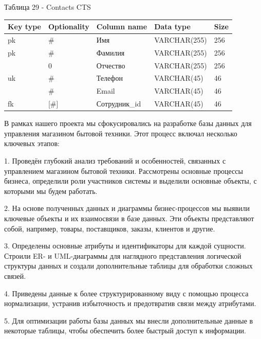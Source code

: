 \documentclass[14pt]{extreport}
\begin{document}
\noindent
Таблица 29 - Contacts CTS
\begin{center}
\begin{longtable}{ |m{1.3cm}|m{2.7cm}|m{4.5cm}|m{3.5cm}|m{1.8cm}| } 
 \hline
 Key type & Optionality & Column name & Data type & Size \\ [0.5ex] 
 \hline\hline
 pk & \# & Имя & VARCHAR(255) & 256 \\
 \hline
 pk & \# & Фамилия & VARCHAR(255) & 256 \\
 \hline
  & 0 & Отчество & VARCHAR(255) & 256 \\
 \hline
 uk & \# & Телефон & VARCHAR(45) & 46 \\
 \hline
  & \# & Email & VARCHAR(45) & 46 \\
 \hline
 fk & [\#] & Сотрудник\_id & VARCHAR(45) & 46 \\
 \hline
\end{longtable}
\end{center}


\conclusions


В рамках нашего проекта мы сфокусировались на разработке базы данных для управления магазином бытовой техники. Этот процесс включал несколько ключевых этапов:

1. Проведён глубокий анализ требований и особенностей, связанных с управлением магазином бытовой техники. Рассмотрены основные процессы бизнеса, определили роли участников системы и выделили основные объекты, с которыми мы будем работать.

2. На основе полученных данных и диаграммы бизнес-процессов мы выявили ключевые объекты и их взаимосвязи в базе данных. Эти объекты представляют собой, например, товары, поставщиков, заказы, клиентов и другие.

3. Определены основные атрибуты и идентификаторы для каждой сущности. Строили ER- и UML-диаграммы для наглядного представления логической структуры данных и создали дополнительные таблицы для обработки сложных связей.

4. Приведены данные к более структурированному виду с помощью процесса нормализации, устранив избыточность и предотвратив связи между атрибутами.

5. Для оптимизации работы базы данных мы внесли дополнительные данные в некоторые таблицы, чтобы обеспечить более быстрый доступ к информации.
\end{document}
